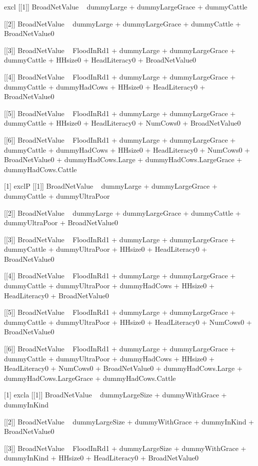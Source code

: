 \begin{Schunk}
\begin{Soutput}
[1] excl
[[1]]
BroadNetValue ~ dummyLarge + dummyLargeGrace + dummyCattle

[[2]]
BroadNetValue ~ dummyLarge + dummyLargeGrace + dummyCattle + 
    BroadNetValue0

[[3]]
BroadNetValue ~ FloodInRd1 + dummyLarge + dummyLargeGrace + dummyCattle + 
    HHsize0 + HeadLiteracy0 + BroadNetValue0

[[4]]
BroadNetValue ~ FloodInRd1 + dummyLarge + dummyLargeGrace + dummyCattle + 
    dummyHadCows + HHsize0 + HeadLiteracy0 + BroadNetValue0

[[5]]
BroadNetValue ~ FloodInRd1 + dummyLarge + dummyLargeGrace + dummyCattle + 
    HHsize0 + HeadLiteracy0 + NumCows0 + BroadNetValue0

[[6]]
BroadNetValue ~ FloodInRd1 + dummyLarge + dummyLargeGrace + dummyCattle + 
    dummyHadCows + HHsize0 + HeadLiteracy0 + NumCows0 + BroadNetValue0 + 
    dummyHadCows.Large + dummyHadCows.LargeGrace + dummyHadCows.Cattle

[1] exclP
[[1]]
BroadNetValue ~ dummyLarge + dummyLargeGrace + dummyCattle + 
    dummyUltraPoor

[[2]]
BroadNetValue ~ dummyLarge + dummyLargeGrace + dummyCattle + 
    dummyUltraPoor + BroadNetValue0

[[3]]
BroadNetValue ~ FloodInRd1 + dummyLarge + dummyLargeGrace + dummyCattle + 
    dummyUltraPoor + HHsize0 + HeadLiteracy0 + BroadNetValue0

[[4]]
BroadNetValue ~ FloodInRd1 + dummyLarge + dummyLargeGrace + dummyCattle + 
    dummyUltraPoor + dummyHadCows + HHsize0 + HeadLiteracy0 + 
    BroadNetValue0

[[5]]
BroadNetValue ~ FloodInRd1 + dummyLarge + dummyLargeGrace + dummyCattle + 
    dummyUltraPoor + HHsize0 + HeadLiteracy0 + NumCows0 + BroadNetValue0

[[6]]
BroadNetValue ~ FloodInRd1 + dummyLarge + dummyLargeGrace + dummyCattle + 
    dummyUltraPoor + dummyHadCows + HHsize0 + HeadLiteracy0 + 
    NumCows0 + BroadNetValue0 + dummyHadCows.Large + dummyHadCows.LargeGrace + 
    dummyHadCows.Cattle

[1] excla
[[1]]
BroadNetValue ~ dummyLargeSize + dummyWithGrace + dummyInKind

[[2]]
BroadNetValue ~ dummyLargeSize + dummyWithGrace + dummyInKind + 
    BroadNetValue0

[[3]]
BroadNetValue ~ FloodInRd1 + dummyLargeSize + dummyWithGrace + 
    dummyInKind + HHsize0 + HeadLiteracy0 + BroadNetValue0


\end{Soutput}
\end{Schunk}
